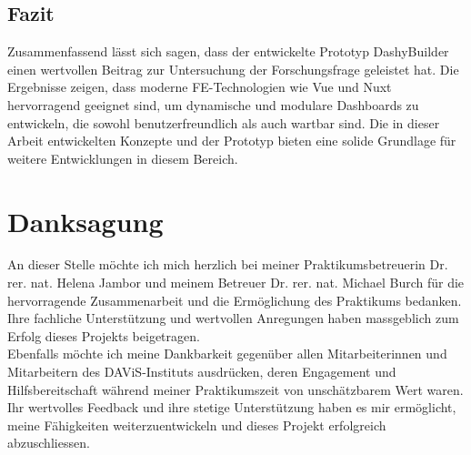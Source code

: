 \documentclass[a4paper, 12pt]{scrartcl}
\begin{document}
\subsection{Fazit}
Zusammenfassend lässt sich sagen, dass der entwickelte Prototyp DashyBuilder einen wertvollen Beitrag zur Untersuchung der Forschungsfrage geleistet hat. Die Ergebnisse zeigen, dass moderne \ac{FE}-Technologien wie \ac{Vue} und \ac{Nuxt} hervorragend geeignet sind, um dynamische und modulare Dashboards zu entwickeln, die sowohl benutzerfreundlich als auch wartbar sind. Die in dieser Arbeit entwickelten Konzepte und der Prototyp bieten eine solide Grundlage für weitere Entwicklungen in diesem Bereich.
\clearpage
	\section{Danksagung}
	\label{sec:danksagung}
An dieser Stelle möchte ich mich herzlich bei meiner Praktikumsbetreuerin Dr. rer. nat. Helena Jambor und meinem Betreuer Dr. rer. nat. Michael Burch für die hervorragende Zusammenarbeit und die Ermöglichung des Praktikums bedanken. Ihre fachliche Unterstützung und wertvollen Anregungen haben massgeblich zum Erfolg dieses Projekts beigetragen.\\[1em]Ebenfalls möchte ich meine Dankbarkeit gegenüber allen Mitarbeiterinnen und Mitarbeitern des DAViS-Instituts ausdrücken, deren Engagement und Hilfsbereitschaft während meiner Praktikumszeit von unschätzbarem Wert waren. Ihr wertvolles Feedback und ihre stetige Unterstützung haben es mir ermöglicht, meine Fähigkeiten weiterzuentwickeln und dieses Projekt erfolgreich abzuschliessen.


\intextsep 5pt




\newpage
{}
\setcounter{page}{4}

\newpage
\nocite{*} %
\printbibliography[heading=bibnumbered, title={Literaturverzeichnis}, notkeyword=verwendet] %
\end{document}
